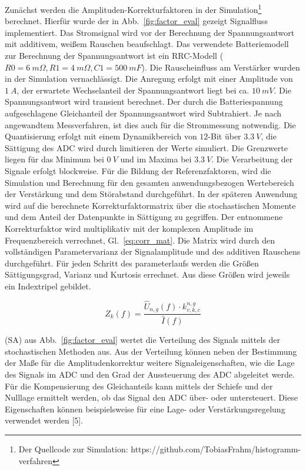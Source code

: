 Zunächst werden die Amplituden-Korrekturfaktoren in der Simulation\footnote[2]{Der Quellcode zur Simulation: https://github.com/TobiasFrahm/histogramm-verfahren} berechnet. Hierfür wurde der in Abb.~\ref{fig:factor_eval} gezeigt Signalfluss implementiert. Das Stromsignal wird vor der Berechnung der Spannungsantwort mit additivem, weißem Rauschen beaufschlagt. Das verwendete Batteriemodell zur Berechnung der Spannungsantwort ist ein RRC-Modell ($R0 = \SI{6}{m\Omega}, R1=\SI{4}{m\Omega}, C1=\SI{500}{mF}$). Die Rauscheinfluss am Verstärker wurden in der Simulation vernachlässigt. Die Anregung erfolgt mit einer Amplitude von $\SI{1}{A}$, der erwartete Wechselanteil der Spannungsantwort liegt bei ca. $\SI{10}{mV}$. Die Spannungsantwort wird transient berechnet. Der durch die Batteriespannung aufgeschlagene Gleichanteil der Spannungsantwort wird Subtrahiert. Je nach angewandtem Messverfahren, ist dies auch für die Strommessung notwendig. Die Quantisierung erfolgt mit einem Dynamikbereich von $12$-Bit über $\SI{3.3}{V}$, die Sättigung des ADC wird durch limitieren der Werte simuliert. Die Grenzwerte liegen für das Minimum bei $\SI{0}{V}$ und im Maxima bei $\SI{3.3}{V}$. Die Verarbeitung der Signale erfolgt blockweise. Für die Bildung der Referenzfaktoren, wird die Simulation und Berechnung für den gesamten anwendungsbezogen Wertebereich der Verstärkung und dem Störabstand durchgeführt. In der späteren Anwendung wird auf die berechnete Korrekturfaktormatrix über die stochastischen Momente und dem Anteil der Datenpunkte in Sättigung zu gegriffen. Der entnommene Korrekturfaktor wird multiplikativ mit der komplexen Amplitude im Frequenzbereich verrechnet, Gl.~\eqref{eq:corr_mat}. Die Matrix wird durch den vollständigen Parametervarianz der Signalamplitude und des additiven Rauschens durchgeführt. Für jeden Schritt des parameterlaufs werden die Größen Sättigungsgrad, Varianz und Kurtosis errechnet. Aus diese Größen wird jeweils ein Indextripel gebildet.

\begin{equation}
	\label{eq:corr_mat}
	Z_k(f) = \frac{\hat{U}_{n,g}(f) \cdot k_{v,k,c}^{n,g}}{\hat{I}(f)}
\end{equation}	

(SA) aus Abb.~\ref{fig:factor_eval} wertet die Verteilung des Signals mittels der stochastischen Methoden aus. Aus der Verteilung können neben der Bestimmung der Maße für die Amplitudenkorrektur weitere Signaleigenschaften, wie die Lage des Signals im ADC und den Grad der Aussteuerung des ADC abgeleitet werde. Für die Kompensierung des Gleichanteils kann mittels der Schiefe und der Nulllage ermittelt werden, ob das Signal den ADC über- oder  untersteuert. Diese Eigenschaften können beispielsweise für eine Lage- oder Verstärkungsregelung verwendet werden [5].


